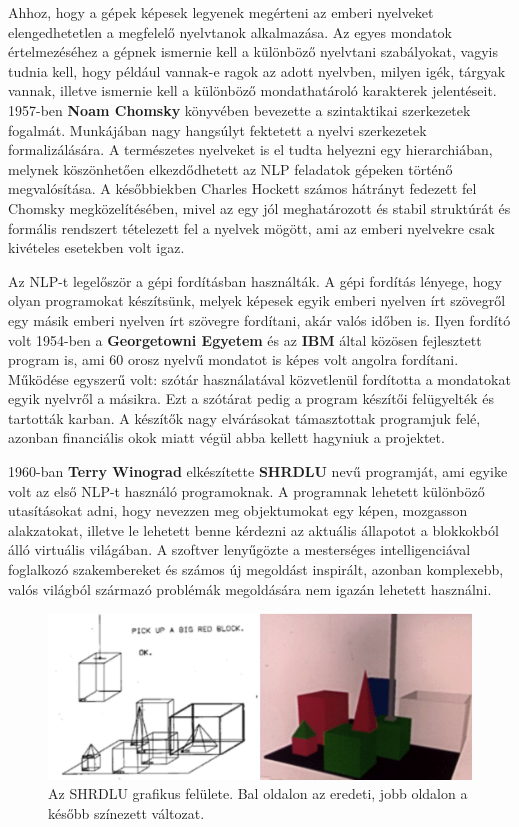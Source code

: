 Ahhoz, hogy a gépek képesek legyenek megérteni az emberi nyelveket elengedhetetlen a megfelelő nyelvtanok alkalmazása. Az egyes mondatok értelmezéséhez a gépnek ismernie kell a különböző nyelvtani szabályokat, vagyis tudnia kell, hogy például vannak-e ragok az adott nyelvben, milyen igék, tárgyak vannak, illetve ismernie kell a különböző mondathatároló karakterek jelentéseit. 1957-ben \textbf{Noam Chomsky} könyvében\cite{chomsky} bevezette a szintaktikai szerkezetek fogalmát. Munkájában nagy hangsúlyt fektetett a nyelvi szerkezetek formalizálására. A természetes nyelveket is el tudta helyezni egy hierarchiában, melynek köszönhetően elkezdődhetett az NLP feladatok gépeken történő megvalósítása. A későbbiekben Charles Hockett számos hátrányt fedezett fel Chomsky megközelítésében, mivel az egy jól meghatározott és stabil struktúrát és formális rendszert tételezett fel a nyelvek mögött, ami az emberi nyelvekre csak kivételes esetekben volt igaz.

Az NLP-t legelőször a gépi fordításban használták. A gépi fordítás lényege, hogy olyan programokat készítsünk, melyek képesek egyik emberi nyelven írt szövegről egy másik emberi nyelven írt szövegre fordítani, akár valós időben is. Ilyen fordító volt 1954-ben a \textbf{Georgetowni Egyetem} és az \textbf{IBM} által közösen fejlesztett program\cite{ibm_trans} is, ami 60 orosz nyelvű mondatot is képes volt angolra fordítani. Működése egyszerű volt: szótár használatával közvetlenül fordította a mondatokat egyik nyelvről a másikra. Ezt a szótárat pedig a program készítői felügyelték és tartották karban. A készítők nagy elvárásokat támasztottak programjuk felé, azonban financiális okok miatt végül abba kellett hagyniuk a projektet.

1960-ban \textbf{Terry Winograd} elkészítette \textbf{SHRDLU} nevű programját\cite{history}, ami egyike volt az első NLP-t használó programoknak. A programnak lehetett különböző utasításokat adni, hogy nevezzen meg objektumokat egy képen, mozgasson alakzatokat, illetve le lehetett benne kérdezni az aktuális állapotot a blokkokból álló virtuális világában. A szoftver lenyűgözte a mesterséges intelligenciával foglalkozó szakembereket és számos új megoldást inspirált, azonban komplexebb, valós világból származó problémák megoldására nem igazán lehetett használni.

\begin{figure}[h]
\centering
\includegraphics[scale=0.5]{images/shrdlu.png}
\caption{Az SHRDLU grafikus felülete. Bal oldalon az eredeti, jobb oldalon a később színezett változat. \cite{shrdlu}}
\label{fig:shrdlu}
\end{figure}


